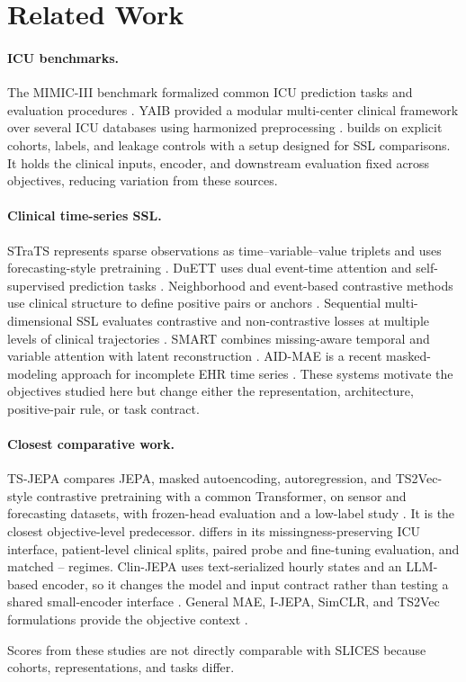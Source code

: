 \section{Related Work}
\label{sec:related}

\paragraph{ICU benchmarks.}
The MIMIC-III benchmark formalized common ICU prediction tasks and evaluation procedures \citep{harutyunyan2019multitask}. YAIB provided a modular multi-center clinical framework over several ICU databases using harmonized preprocessing \citep{van_de_water2024yaib}. \SLICES{} builds on explicit cohorts, labels, and leakage controls with a setup designed for SSL comparisons. It holds the clinical inputs, encoder, and downstream evaluation fixed across objectives, reducing variation from these sources.

\paragraph{Clinical time-series SSL.}
STraTS represents sparse observations as time--variable--value triplets and uses forecasting-style pretraining \citep{tipirneni2022strats}. DuETT uses dual event-time attention and self-supervised prediction tasks \citep{labach2023duett}. Neighborhood and event-based contrastive methods use clinical structure to define positive pairs or anchors \citep{yeche2021ncl,oufattole2024ebcl}. Sequential multi-dimensional SSL evaluates contrastive and non-contrastive losses at multiple levels of clinical trajectories \citep{raghu2023smdssl}. SMART combines missing-aware temporal and variable attention with latent reconstruction \citep{yu2024smart}. AID-MAE is a recent masked-modeling approach for incomplete EHR time series \citep{xiang2026aidmae}. These systems motivate the objectives studied here but change either the representation, architecture, positive-pair rule, or task contract.

\paragraph{Closest comparative work.}
TS-JEPA compares JEPA, masked autoencoding, autoregression, and TS2Vec-style contrastive pretraining with a common Transformer, on sensor and forecasting datasets, with frozen-head evaluation and a low-label study \citep{ennadir2024tsjepa}. It is the closest objective-level predecessor. \SLICES{} differs in its missingness-preserving ICU interface, patient-level clinical splits, paired probe and fine-tuning evaluation, and matched \MIMIC{}--\EICU{} regimes. Clin-JEPA uses text-serialized hourly states and an LLM-based encoder, so it changes the model and input contract rather than testing a shared small-encoder interface \citep{yang2026clinjepa}. General MAE, I-JEPA, SimCLR, and TS2Vec formulations provide the objective context \citep{he2022mae,assran2023ijepa,chen2020simclr,yue2022ts2vec}.

Scores from these studies are not directly comparable with SLICES because cohorts, representations, and tasks differ.
